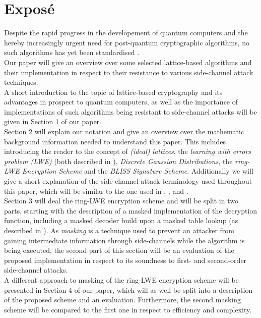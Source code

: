 %
%

\chapter{Expos\'{e}}
Despite the rapid progress in the developement of quantum computers and the hereby increasingly urgent need for post-quantum cryptographic algorithms, no such algorithms has yet been standardised \cite{Nist}.\\
Our paper will give an overview over some selected lattice-based algorithms and their implementation in respect to their resistance to various side-channel attack techniques.\\
A short introduction to the topic of lattice-based cryptography and its advantages in prospect to quantum computers, %
as well as the importance of implementations of such algorithms being resistant to side-channel attacks will be given in Section 1 of our paper.\\ 
Section 2 will explain our notation and give an overview over the mathematic background information needed to understand this paper. This includes introducing the reader to the concept of \textit{(ideal) lattices}, the \textit{learning with errors problem (LWE)} (both described in \cite{cryptoeprint:2012:230}), \textit{Discrete Gaussion Distributions}, the \textit{ring-LWE Encryption Scheme} and the \textit{BLISS Signature Scheme}. Additionally we will give a short explanation of the side-channel attack terminology used throughout this paper, which will be similar to the one used in \cite{DBLP:conf/crypto/KocherJJ99}, \cite{Kocher2011}, \cite{cryptoeprint:2010:646} and \cite{cryptoeprint:2010:385}.\\ 
Section 3 will deal the ring-LWE encryption scheme and will be split in two parts, starting with the description of a masked implementation of the decryption function, including a masked decoder build upon a masked table lookup (as described in \cite{maskedRing}). As \textit{masking} is a technique used to prevent an attacker from gaining intermediate information through side-channels while the algorithm is being executed, the second part of this section will be an evaluation of the proposed implementation in respect to its soundness to first- and second-order side-channel attacks.\\ 
A different approach to masking of the ring-LWE encryption scheme \cite{Reparaz2016} will be presented in Section 4 of our paper, which will as well be split into a description of the proposed scheme and an evaluation. Furthermore, the second masking scheme will be compared to the first one in respect to efficiency and complexity.\\

